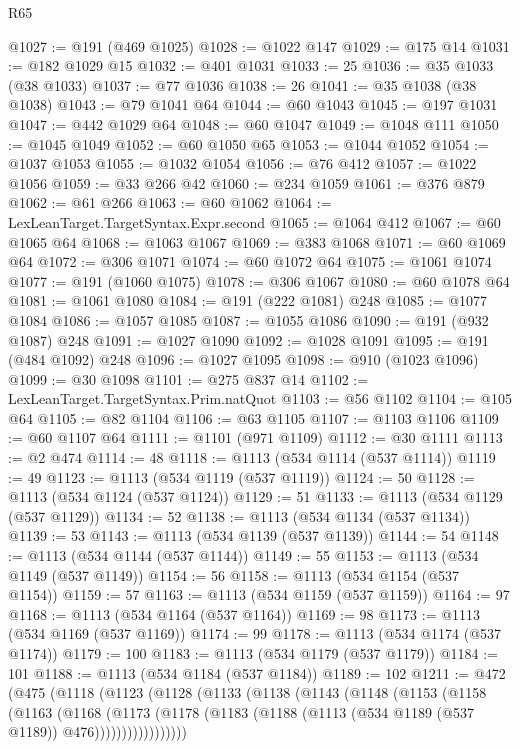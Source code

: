 \begin{lexlean}{R65}
\begin{coremodule}
@1027 := @191 (@469 @1025)
@1028 := @1022 @147
@1029 := @175 @14
@1031 := @182 @1029 @15
@1032 := @401 @1031
@1033 := 25
@1036 := @35 @1033 (@38 @1033)
@1037 := @77 @1036
@1038 := 26
@1041 := @35 @1038 (@38 @1038)
@1043 := @79 @1041 @64
@1044 := @60 @1043
@1045 := @197 @1031
@1047 := @442 @1029 @64
@1048 := @60 @1047
@1049 := @1048 @111
@1050 := @1045 @1049
@1052 := @60 @1050 @65
@1053 := @1044 @1052
@1054 := @1037 @1053
@1055 := @1032 @1054
@1056 := @76 @412
@1057 := @1022 @1056
@1059 := @33 @266 @42
@1060 := @234 @1059
@1061 := @376 @879
@1062 := @61 @266
@1063 := @60 @1062
@1064 := LexLeanTarget.TargetSyntax.Expr.second
@1065 := @1064 @412
@1067 := @60 @1065 @64
@1068 := @1063 @1067
@1069 := @383 @1068
@1071 := @60 @1069 @64
@1072 := @306 @1071
@1074 := @60 @1072 @64
@1075 := @1061 @1074
@1077 := @191 (@1060 @1075)
@1078 := @306 @1067
@1080 := @60 @1078 @64
@1081 := @1061 @1080
@1084 := @191 (@222 @1081) @248
@1085 := @1077 @1084
@1086 := @1057 @1085
@1087 := @1055 @1086
@1090 := @191 (@932 @1087) @248
@1091 := @1027 @1090
@1092 := @1028 @1091
@1095 := @191 (@484 @1092) @248
@1096 := @1027 @1095
@1098 := @910 (@1023 @1096)
@1099 := @30 @1098
@1101 := @275 @837 @14
@1102 := LexLeanTarget.TargetSyntax.Prim.natQuot
@1103 := @56 @1102
@1104 := @105 @64
@1105 := @82 @1104
@1106 := @63 @1105
@1107 := @1103 @1106
@1109 := @60 @1107 @64
@1111 := @1101 (@971 @1109)
@1112 := @30 @1111
@1113 := @2 @474
@1114 := 48
@1118 := @1113 (@534 @1114 (@537 @1114))
@1119 := 49
@1123 := @1113 (@534 @1119 (@537 @1119))
@1124 := 50
@1128 := @1113 (@534 @1124 (@537 @1124))
@1129 := 51
@1133 := @1113 (@534 @1129 (@537 @1129))
@1134 := 52
@1138 := @1113 (@534 @1134 (@537 @1134))
@1139 := 53
@1143 := @1113 (@534 @1139 (@537 @1139))
@1144 := 54
@1148 := @1113 (@534 @1144 (@537 @1144))
@1149 := 55
@1153 := @1113 (@534 @1149 (@537 @1149))
@1154 := 56
@1158 := @1113 (@534 @1154 (@537 @1154))
@1159 := 57
@1163 := @1113 (@534 @1159 (@537 @1159))
@1164 := 97
@1168 := @1113 (@534 @1164 (@537 @1164))
@1169 := 98
@1173 := @1113 (@534 @1169 (@537 @1169))
@1174 := 99
@1178 := @1113 (@534 @1174 (@537 @1174))
@1179 := 100
@1183 := @1113 (@534 @1179 (@537 @1179))
@1184 := 101
@1188 := @1113 (@534 @1184 (@537 @1184))
@1189 := 102
@1211 := @472
    (@475
      (@1118
        (@1123
          (@1128
            (@1133
              (@1138
                (@1143
                  (@1148
                    (@1153
                      (@1158
                        (@1163
                          (@1168
                            (@1173
                              (@1178
                                (@1183 (@1188 (@1113 (@534 @1189 (@537 @1189)) @476)))))))))))))))))

\end{coremodule}
\end{lexlean}
